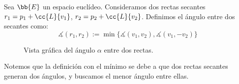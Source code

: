 \begin{definicion}
    Sea $\bb{E}$ un espacio euclídeo. Consideramos dos rectas secantes $r_1=p_1 + \cc{L}\{v_1\}$, $r_2=p_2 + \cc{L}\{v_2\}$. Definimos el ángulo entre dos secantes como:
    \begin{equation*}
        \measuredangle(r_1,r_2)
        := \min\{\measuredangle(v_1,v_2), \measuredangle(v_1,-v_2)\}
    \end{equation*}
    \begin{figure}[H]
        \centering
        \caption{Vista gráfica del ángulo $\alpha$ entre dos rectas.}
    \end{figure}
\end{definicion}
Notemos que la definición con el mínimo se debe a que dos rectas secantes generan dos ángulos, y buscamos el menor ángulo entre ellas.


